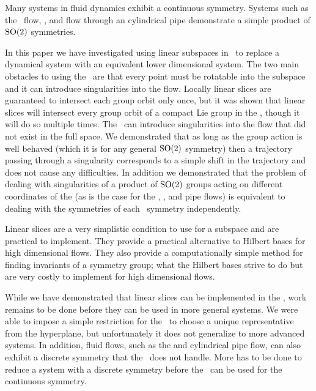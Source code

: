 

Many systems in fluid dynamics exhibit a continuous symmetry. Systems
such as the \KS\ flow,
{\pCf}, and flow through an
cylindrical pipe demonstrate a simple product of
$\textrm{SO}(2)$ symmetries.

In this paper we have investigated using linear subspaces in
\mslices\ to replace a dynamical system with an equivalent
lower dimensional system. The two main obstacles to using the \mslices\
are that every point must be rotatable into the subspace and it can
introduce singularities into the flow. Locally linear slices are
guaranteed to intersect each group orbit only once, but it was shown that
linear slices will intersect every group orbit of a compact Lie group in
the {\statesp}, though it will do so multiple times. The \mslices\ can
introduce singularities into the flow that did not exist in the full
space. We demonstrated that as long as the group action is well behaved
(which it is for any general $\textrm{SO}(2)$ symmetry) then a trajectory
passing through a singularity corresponds to a simple shift in the
trajectory and does not cause any difficulties. In addition we
demonstrated that the problem of dealing with singularities of a product
of $\textrm{SO}(2)$ groups acting on different coordinates of the {\statesp}
(as is the case for the \KS\rf{ku,siv},
{\pCf}, and
pipe flows) is equivalent to dealing with the
symmetries of each \SOn{2}\ symmetry independently.

Linear slices are a very simplistic condition to use for a subspace and
are practical to implement. They provide a practical alternative to
Hilbert bases for high dimensional flows. They also provide a
computationally simple method for finding invariants of a symmetry group;
what the Hilbert bases strive to do but are very costly to implement for
high dimensional flows.

While we have demonstrated that linear slices can be implemented in the
\mslices, work remains to be done before they can be used in more general
systems. We were able to impose a simple restriction for the
\cLe\ to choose a unique representative from the
hyperplane, but unfortunately it does not generalize to more advanced
systems. In addition, fluid flows, such as the {\pCf} and cylindrical
pipe flow, can also exhibit a discrete symmetry that the \mslices\ does
not handle. More has to be done to reduce a system with a discrete
symmetry before the \mslices\ can be used for the continuous symmetry.
